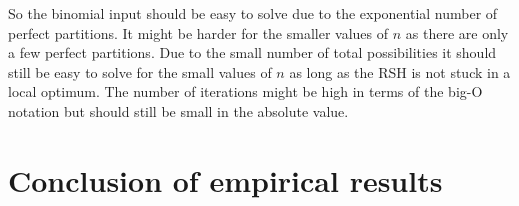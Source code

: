 
So the binomial input should be easy to solve due to the exponential number of perfect partitions.
It might be harder for the smaller values of $n$ as there are only a few perfect partitions.
Due to the small number of total possibilities it should still be easy to solve for the small values of $n$ as long as the RSH is not stuck in a local optimum.
The number of iterations might be high in terms of the big-O notation but should still be small in the absolute value.

% 











\section{Conclusion of empirical results}
